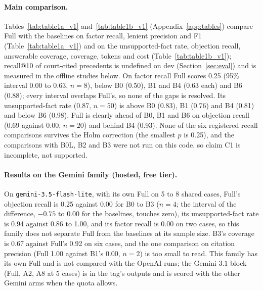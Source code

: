 \paragraph{Main comparison.} Tables~\ref{tab:table1a_v1} and~\ref{tab:table1b_v1} (Appendix~\ref{app:tables}) compare Full with the baselines on factor recall, lenient precision and F1 (Table~\ref{tab:table1a_v1}) and on the unsupported-fact rate, objection recall, answerable coverage, coverage, tokens and cost (Table~\ref{tab:table1b_v1}); recall@10 of court-cited precedents is undefined on dev (Section~\ref{sec:eval}) and is measured in the offline studies below. On factor recall Full scores 0.25 (95\% interval 0.00 to 0.63, $n=8$), below B0 (0.50), B1 and B4 (0.63 each) and B6 (0.88); every interval overlaps Full's, so none of the gaps is resolved. Its unsupported-fact rate (0.87, $n=50$) is above B0 (0.83), B1 (0.76) and B4 (0.81) and below B6 (0.98). Full is clearly ahead of B0, B1 and B6 on objection recall (0.69 against 0.00, $n=20$) and behind B4 (0.93). None of the six registered recall comparisons survives the Holm correction (the smallest $p$ is 0.25), and the comparisons with B0L, B2 and B3 were not run on this code, so claim C1 is incomplete, not supported.



\paragraph{Results on the Gemini family (hosted, free tier).}   On \texttt{gemini-3.5-flash-lite}, with its own Full on 5 to 8 shared cases, Full's objection recall is 0.25 against 0.00 for B0 to B3 ($n=4$; the interval of the difference, $-0.75$ to $0.00$ for the baselines, touches zero), its unsupported-fact rate is 0.94 against 0.86 to 1.00, and its factor recall is 0.00 on two cases, so this family does not separate Full from the baselines at its sample size. B3's coverage is 0.67 against Full's 0.92 on six cases, and the one comparison on citation precision (Full 1.00 against B1's 0.00, $n=2$) is too small to read. This family has its own Full and is not compared with the OpenAI runs; the Gemini $3.1$ block (Full, A2, A8 at 5 cases) is in the tag's outputs and is scored with the other Gemini arms when the quota allows.

